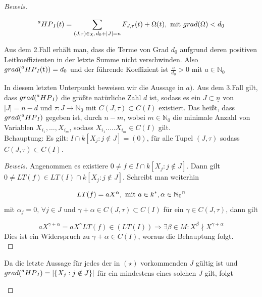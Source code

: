 \documentclass{article}
\newcommand*{\indx}[2]{{#1}_{#2}}
\newcommand*{\potx}[2]{{#1}^{#2}}
\newcommand*{\N}{\mathbb{N}_0}
\newcommand*{\hp}[1]{$\prescript{a}{}{HP}_{#1}$}
\begin{document}
\begin{proof}[Beweis]
\begin{compactenum}
\begin{displaymath}
\textnormal{\hp{I}}(t)=\sum\limits_{(J,\tau)\in \chi,\, \indx{d}{0}+|J|=n}{\indx{F}{J,\tau}(t)} +\Omega(t), \textnormal{ mit } grad(\Omega)<\indx{d}{0}\\
\end{displaymath}

Aus dem 2.Fall erhält man, dass die Terme von Grad $\indx{d}{0}$ aufgrund deren positiven Leitkoeffizienten in der letzte Summe nicht verschwinden. Also $grad(\textnormal{\hp{I}(t)})=\indx{d}{0}$ und der führende Koeffizient ist $\frac{a}{\indx{d}{0}}>0$ mit $a\in\N$

\item In diesem letzten Unterpunkt beweisen wir die Aussage in $a)$. Aus dem 3.Fall gilt, dass $grad(\textnormal{\hp{I}})$ die größte natürliche Zahl $d$ ist, sodass es ein $J\subset\underline{n}$ von $|J|=n-d$ und $\tau: J\rightarrow\N$ mit $C(J,\tau)\subset C(I)$  existiert. Das heißt, dass $grad(\textnormal{\hp{I}})$ gegeben ist, durch $n-m$, wobei $m\in\N$ die minimale Anzahl von Variablen $\indx{X}{\indx{i}{1}},\ldots,\indx{X}{\indx{i}{m}}$, sodass $\indx{X}{\indx{i}{1}}.\ldots.\indx{X}{\indx{i}{m}}\in C(I)$ gilt.\\

Behauptung: Es gilt: $I\cap k\left[\indx{X}{j}:j\notin J\right]={(0)}$, für alle Tupel $(J,\tau)$ sodass $C(J,\tau)\subset C(I)$.\\

\begin{proof}[Beweis]
	Angenommen es existiere $ 0\neq f\in I\cap k\left[\indx{X}{j}:j\notin J\right]$. Dann gilt 
	$ 0\neq LT(f)\in LT(I)\cap k\left[\indx{X}{j}:j\notin J\right]$. Schreibt man weiterhin
	
	\begin{displaymath}
	LT(f)=a\potx{X}{\alpha}, \textnormal{ mit } a\in\potx{k}{*}, \alpha\in\potx{\N}{n} 
	\end{displaymath}
	mit  $\indx{\alpha}{j}=0, \,\forall j\in J$ und $\gamma+\alpha \in C(J,\tau)\subset C(I)$ für ein $\gamma\in C(J,\tau)$, dann gilt 
	
	\begin{displaymath}
	a\potx{X}{\gamma+\alpha}=a\potx{X}{\gamma}LT(f)\in(LT(I))\Rightarrow\exists\beta\in M:\potx{X}{\beta}\nmid\potx{X}{\gamma+\alpha}
	\end{displaymath}
Dies ist  ein Widerspruch zu $\gamma+\alpha\in C(I)$, woraus die Behauptung folgt. \\
\end{proof} 
Da die letzte Aussage für jedes der in $(\star)$ vorkommenden $J$ gültig ist und $grad(\textnormal{\hp{I}})=\left|\{\indx{X}{j}:j\notin J\}\right|$ für ein mindestens eines solchen $J$ gilt, folgt


\end{compactenum}
\end{proof}
\end{document}
